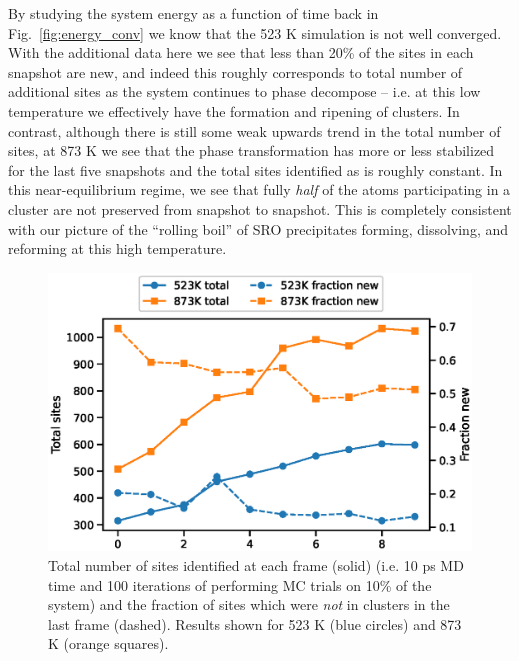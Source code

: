 By studying the system energy as a function of time back in Fig.~\ref{fig:energy_conv} we know that the 523 K simulation is not well converged.
With the additional data here we see that less than 20\% of the \DOTHREE sites in each snapshot are new, and indeed this roughly corresponds to total number of additional sites as the system continues to phase decompose -- i.e. at this low temperature we effectively have the formation and ripening of clusters.
In contrast, although there is still some weak upwards trend in the total number of \DOTHREE sites, at 873 K we see that the phase transformation has more or less stabilized for the last five snapshots and the total sites identified as \DOTHREE is roughly constant.
In this near-equilibrium regime, we see that fully \emph{half} of the atoms participating in a \DOTHREE cluster are not preserved from snapshot to snapshot.
This is completely consistent with our picture of the ``rolling boil'' of SRO precipitates forming, dissolving, and reforming at this high temperature.

\begin{figure}[h]
    \centering
    \includegraphics[width=\textwidth,height=0.75\textheight,keepaspectratio]{figures/cluster_turnover}
    \caption{Total number of \DOTHREE sites identified at each frame (solid) (i.e. 10 ps MD time and 100 iterations of performing MC trials on 10\% of the system) and the fraction of sites which were \emph{not} in clusters in the last frame (dashed). Results shown for 523 K (blue circles) and 873 K (orange squares).}
    \label{fig:turnover}
\end{figure}

